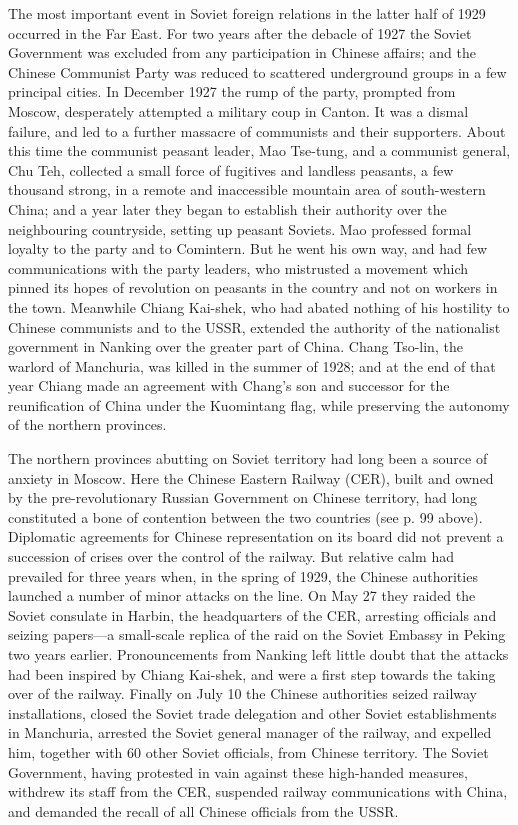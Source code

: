 The most important event in Soviet foreign relations in the latter half of 1929 occurred in the Far East. For two years after the debacle of 1927 the Soviet Government was excluded from any participation in Chinese affairs; and the Chinese Communist Party was reduced to scattered underground groups in a few principal cities. In December 1927 the rump of the party, prompted from Moscow, desperately attempted a military coup in Canton. It was a dismal failure, and led to a further massacre of communists and their supporters. About this time the communist peasant leader, Mao Tse-tung, and a communist general, Chu Teh, collected a small force of fugitives and landless peasants, a few thousand strong, in a remote and inaccessible mountain area of south-western China;  and a year later they began to establish their authority over the neighbouring countryside, setting up peasant Soviets. Mao professed formal loyalty to the party and to Comintern. But he went his own way, and had few communications with the party leaders, who mistrusted a movement which pinned its hopes of revolution on peasants in the country and not on workers in the town. Meanwhile Chiang Kai-shek, who had abated nothing of his hostility to Chinese communists and to the USSR, extended the authority of the nationalist government in Nanking over the greater part of China. Chang Tso-lin, the warlord of Manchuria, was killed in the summer of 1928; and at the end of that year Chiang made an agreement with Chang's son and successor for the reunification of China under the Kuomintang flag, while preserving the autonomy of the northern provinces. 

The northern provinces abutting on Soviet territory had long been a source of anxiety in Moscow. Here the Chinese Eastern Railway (CER), built and owned by the pre-revolutionary Russian Government on Chinese territory, had long constituted a bone of contention between the two countries (see p. 99 above).  Diplomatic agreements for Chinese representation on its board did not prevent a succession of crises over the control of the railway. But relative calm had prevailed for three years when, in the spring of 1929, the Chinese authorities launched a number of minor attacks on the line. On May 27 they raided the Soviet consulate in Harbin, the headquarters of the CER, arresting officials and seizing papers---a small-scale replica of the raid on the Soviet Embassy in Peking two years earlier. Pronouncements from Nanking left little doubt that the attacks had been inspired by Chiang Kai-shek, and were a first step towards the taking over of the railway. Finally on July 10 the Chinese authorities seized railway installations, closed the Soviet trade delegation and other Soviet establishments in Manchuria, arrested the Soviet general manager of the railway, and expelled him, together with 60 other Soviet officials, from Chinese territory. The Soviet Government, having protested in vain against these high-handed measures, withdrew its staff from the CER, suspended railway communications with China, and demanded the recall of all Chinese officials from the USSR. 

